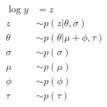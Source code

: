 \documentclass[varwidth=\linewidth]{standalone}
\begin{document}
$$\begin{aligned}
\log y &= z \\
z &\sim p(z|\theta, \sigma) \\
\theta &\sim p(\theta|\mu + \phi, \tau) \\
\sigma &\sim p(\sigma) \\
\mu &\sim p(\mu) \\
\phi &\sim p(\phi) \\
\tau &\sim p(\tau) \\
\end{aligned}$$
\end{document}
